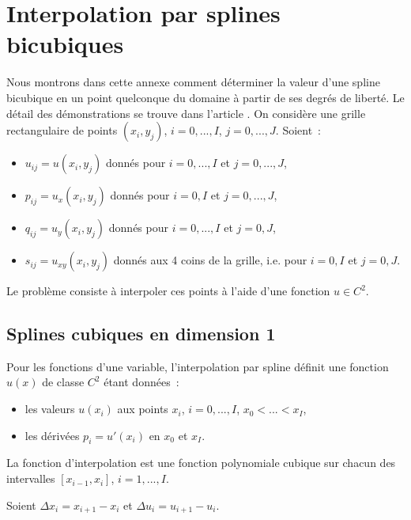 \section{Interpolation par splines bicubiques}
\label{ANN:SPLINES}

Nous montrons dans cette annexe comment d\'eterminer la 
valeur d'une spline bicubique en un point quelconque du domaine 
\`a partir de ses degr\'es de libert\'e. Le d\'etail des 
d\'emonstrations se trouve dans l'article \cite{deb:jmp:62}. 
On consid\`ere une grille rectangulaire de points $(x_i,y_j)$, 
$i=0,...,I$, $j=0,...,J$. Soient~: 
\begin{itemize}
\item $u_{ij} = u(x_i,y_j)$ donn\'es pour $i=0,...,I$ et 
$j=0,...,J$,
\item $p_{ij} = u_x(x_i,y_j)$ donn\'es pour $i=0,I$ et 
$j=0,...,J$,
\item $q_{ij} = u_y(x_i,y_j)$ donn\'es pour $i=0,...,I$ et $j=0,J$,
\item $s_{ij} = u_{xy}(x_i,y_j)$ donn\'es aux 4 coins de la grille, 
i.e. pour $i=0,I$ et $j=0,J$.
\end{itemize}
Le probl\`eme consiste \`a interpoler ces points \`a l'aide d'une 
fonction $u \in C^2$.

\subsection{Splines cubiques en dimension 1}

Pour les fonctions d'une variable, l'interpolation par spline 
d\'efinit une fonction $u(x)$ de classe $C^2$ \'etant donn\'ees~: 
\begin{itemize}
\item les valeurs $u(x_i)$ aux points $x_i$, $i=0,...,I$, 
$x_0<...<x_I$,
\item les d\'eriv\'ees $p_i = u'(x_i)$ en $x_0$ et $x_I$.
\end{itemize}
La fonction d'interpolation est une fonction polynomiale cubique 
sur chacun des intervalles $[x_{i-1},x_i]$, $i=1,...,I$. 

Soient $\Delta x_i = x_{i+1}-x_i$ et $\Delta u_i = u_{i+1}-u_i$. 

